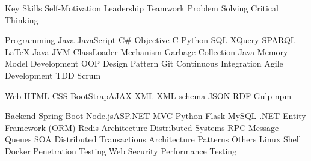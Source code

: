 

\begin{cvskills}

  \cvskill
    {Key Skills} %
    {Self-Motivation \quad Leadership \quad Teamwork \quad Problem Solving \quad Critical Thinking} %
    
  \cvskill
    {Programming} %
    {Java \quad JavaScript \quad C\# \quad Objective-C   \quad Python \quad SQL \quad XQuery  \quad SPARQL \quad LaTeX} %
      \cvskill
    {Java} %
    {JVM \quad ClassLoader Mechanism \quad Garbage Collection \quad Java Memory Model  } %
  \cvskill
    {Development} %
    {OOP \quad Design Pattern \quad Git \quad Continuous Integration \quad Agile Development \quad TDD \quad Scrum} %

  \cvskill
    {Web} %
    {HTML \quad CSS \quad BootStrap\quad AJAX \quad XML \quad XML schema \quad JSON \quad   RDF  \quad Gulp \quad npm} %

   \cvskill
    {Backend} %
    {Spring Boot \quad Node.js\quad ASP.NET MVC \quad Python Flask  \quad MySQL \quad  .NET Entity Framework (ORM) \quad  Redis} %
 \cvskill
    {Architecture} %
    {Distributed Systems \quad RPC \quad Message Queues \quad SOA \quad Distributed Transactions  \quad Architecture Patterns   } %
 \cvskill
    {Others} %
    {Linux \quad Shell \quad Docker \quad Penetration Testing \quad Web Security \quad Performance Testing  } %
\end{cvskills}
